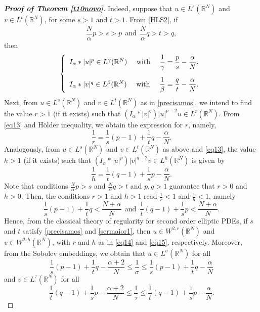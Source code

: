 \documentclass[12pt,a4paper]{article}
\numberwithin{equation}{section}
\begin{document}
\begin{proof}[\bf{Proof of Theorem \ref{t10novo}}]
Indeed, suppose that $u\in L^{s}(\mathbb{R}^N)$ and $v\in L^{t}(\mathbb{R}^N)$, for some $s>1$ and $t>1$. From \eqref{HLS2}, if
\begin{equation}\label{precisamos}
\frac{N}{\alpha}p>s>p \ \ \text{and} \ \ \frac{N}{\alpha}q>t>q,
\end{equation}
then
\begin{equation}\label{eq13}
\left\{\begin{array}{ll}
I_\alpha \ast |u|^p \in L^\gamma(\mathbb{R}^N) \mbox{ \ \ \ with \ \ \ } \dfrac{1}{\gamma} = \dfrac{p}{s}-\dfrac{\alpha}{N}, \vspace{10pt}\\
I_\alpha \ast |v|^q \in L^\beta(\mathbb{R}^N) \mbox{ \ \ \ with \ \ \ } \dfrac{1}{\beta} = \dfrac{q}{t}-\dfrac{\alpha}{N}.
\end{array} \right.
\end{equation}
Next, from $u\in L^{s}(\mathbb{R}^N)$ and $v\in L^{t}(\mathbb{R}^N)$ as in \eqref{precisamos}, we intend to find the value $r>1$ (if it exists) such that $(I_\alpha \ast |v|^q)|u|^{p-2}u \in L^{r}(\mathbb{R}^N)$. From \eqref{eq13} and Hölder inequality, we obtain the expression for $r$, namely,
\begin{equation}\label{eq14}
\dfrac{1}{r}=\dfrac{1}{s}(p-1)+\dfrac{1}{t}q-\dfrac{\alpha}{N}.
\end{equation}
Analogously, from $u\in L^{s}(\mathbb{R}^N)$ and $v\in L^{t}(\mathbb{R}^N)$ as above and \eqref{eq13}, the value $h>1$ (if it exists) such that $(I_\alpha \ast |u|^p)|v|^{q-2}v \in L^{h}(\mathbb{R}^N)$ is given by
\begin{equation}\label{eq15}
\dfrac{1}{h}=\dfrac{1}{t}(q-1)+\dfrac{1}{s}p-\dfrac{\alpha}{N}.
\end{equation}
Note that conditions $\frac{N}{\alpha}p >s$ and $\frac{N}{\alpha}q>t$ and $p,q>1$ guarantee that $r>0$ and $h>0$. Then, the conditions $r>1$ and $h>1$ read $\frac{1}{r}<1$ and $\frac{1}{h}<1$, namely
\begin{equation}\label{sermaior1}
\dfrac{1}{s}(p-1)+\dfrac{1}{t}q<\dfrac{N+\alpha}{N} \ \ \text{and} \ \ 
\dfrac{1}{t}(q-1)+\dfrac{1}{s}p<\dfrac{N+\alpha}{N}.
\end{equation}
Hence, from the classical theory of regularity for second order elliptic PDEs, if $s$ and $t$ satisfy \eqref{precisamos} and \eqref{sermaior1}, then $u\in W^{2, r}(\mathbb{R}^N)$ and $v\in W^{2, h}(\mathbb{R}^N)$, with $r$ and $h$ as in \eqref{eq14} and \eqref{eq15}, respectively. Moreover, from the Sobolev embeddings, we obtain that $u\in L^{\sigma}(\mathbb{R}^N)$ for all
\begin{equation}\label{eq19nova}
\dfrac{1}{s}(p-1)+\dfrac{1}{t}q-\dfrac{\alpha+2}{N}\leq \dfrac{1}{\sigma}\leq\dfrac{1}{s}(p-1)+\dfrac{1}{t}q-\dfrac{\alpha}{N} 
\end{equation}
and $v\in L^{\tau}(\mathbb{R}^N)$ for all
\begin{equation}\label{eq20nova}
\dfrac{1}{t}(q-1)+\dfrac{1}{s}p-\dfrac{\alpha+2}{N}\leq\dfrac{1}{\tau}\leq\dfrac{1}{t}(q-1)+\dfrac{1}{s}p-\dfrac{\alpha}{N}.
\end{equation}



\end{proof}
\end{document}
